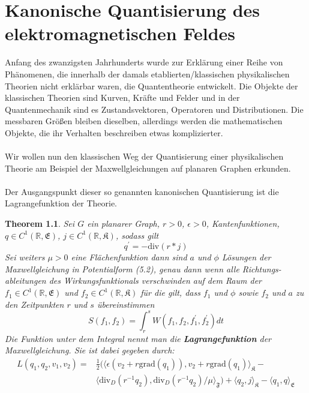 \documentclass[11pt,a4paper,leqno]{report}
\newtheorem{theorem}{Theorem}[chapter]
\numberwithin{equation}{chapter}
\begin{document}
\chapter{Kanonische Quantisierung des elektromagnetischen Feldes}
Anfang des zwanzigsten Jahrhunderts wurde zur Erkl\"arung einer Reihe von Ph\"anomenen, die innerhalb der damals etablierten/klassischen physikalischen Theorien nicht erkl\"arbar waren, die Quantentheorie entwickelt.
Die Objekte der klassischen Theorien sind Kurven, Kr\"afte und Felder und in der Quantenmechanik sind es Zustandsvektoren, Operatoren und Distributionen. Die messbaren Gr\"o\ss{}en bleiben dieselben, allerdings werden die mathematischen Objekte, die ihr Verhalten beschreiben etwas komplizierter.\\
\\
Wir wollen nun den klassischen Weg der Quantisierung einer physikalischen Theorie am Beispiel der Maxwellgleichungen auf planaren Graphen erkunden.\\
\\
Der Ausgangspunkt dieser so genannten kanonischen Quantisierung ist die Lagrangefunktion der Theorie.
\begin{theorem}
Sei $G$ ein planarer Graph, $r>0$, $\epsilon>0$,  Kantenfunktionen, $q\in C^1(\mathbb{R}, \mathfrak{E})$, $j\in C^1(\mathbb{R}, \mathfrak{K})$, sodass gilt
\begin{equation}
	q^\prime = - \text{div}(r*j)
\end{equation}
Sei weiters $\mu>0$ eine Fl\"achenfunktion dann sind $a$ und $\phi$ L\"osungen der Maxwellgleichung in Potentialform (5.2), genau dann wenn alle Richtungs-ableitungen des Wirkungsfunktionals verschwinden auf dem Raum der $f_1\in C^1(\mathbb{R}, \mathfrak{E})$ und $f_2\in C^1(\mathbb{R}, \mathfrak{K})$ f\"ur die gilt, dass $f_1$ und $\phi$ sowie $f_2$ und $a$ zu den Zeitpunkten $r$ und $s$ \"ubereinstimmen
\begin{equation}
	S(f_1, f_2) = \int_{r}^{s}W(f_1, f_2, f_1^\prime, f_2^\prime)dt
\end{equation}
\noindent
Die Funktion unter dem Integral nennt man die \textbf{Lagrangefunktion} der Maxwellgleichung.
Sie ist dabei gegeben durch:
\begin{align*}
	L(q_1, q_2, v_1, v_2) =&\frac{1}{2}(\langle \epsilon(v_2 + r\text{grad}(q_1)), v_2 + r\text{grad}(q_1)\rangle_\mathfrak{K} -\\& \langle\text{div}_D(r^{-1}q_2), \text{div}_D(r^{-1}q_2)/\mu\rangle_\mathfrak{F}) + \langle q_2, j\rangle_\mathfrak{K} - \langle q_1, q\rangle_\mathfrak{E}
\end{align*}
\end{theorem}
\end{document}
